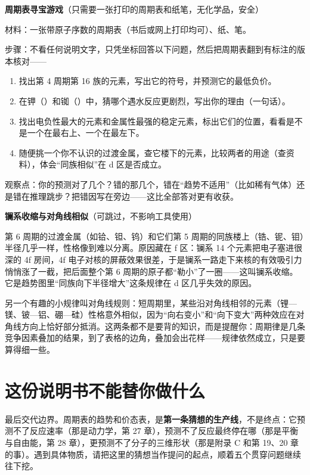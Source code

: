 \begin{shiyan}
\textbf{周期表寻宝游戏}（只需要一张打印的周期表和纸笔，无化学品，安全）

材料：一张带原子序数的周期表（书后或网上打印均可）、纸、笔。

步骤：不看任何说明文字，只凭坐标回答以下问题，然后把周期表翻到有标注的版本核对——
\begin{enumerate}[itemsep=1pt]
\item 找出第 4 周期第 16 族的元素，写出它的符号，并预测它的最低负价。
\item 在钾（）和铷（）中，猜哪个遇水反应更剧烈，写出你的理由（一句话）。
\item 找出电负性最大的元素和金属性最强的稳定元素，标出它们的位置，看看是不是一个在最右上、一个在最左下。
\item 随便挑一个你不认识的过渡金属，查它楼下的元素，比较两者的用途（查资料），体会“同族相似”在 d 区是否成立。
\end{enumerate}

观察点：你的预测对了几个？错的那几个，错在“趋势不适用”（比如稀有气体）还是错在推理跳步？把错因写在旁边——这比全部答对更有收获。
\end{shiyan}

\begin{tiaozhan}
\textbf{镧系收缩与对角线相似}（可跳过，不影响工具使用）

第 6 周期的过渡金属（如铪、钽、钨）和它们第 5 周期的同族楼上（锆、铌、钼）半径几乎一样，性格像到难以分离。原因藏在 f 区：镧系 14 个元素把电子塞进很深的 4f 房间，4f 电子对核的屏蔽效果很差，于是镧系一路走下来核的有效吸引力悄悄涨了一截，把后面整个第 6 周期的原子都“勒小”了一圈——这叫镧系收缩。它是趋势图里“同族向下半径增大”这条规律在 d 区几乎失效的原因。

另一个有趣的小规律叫对角线规则：短周期里，某些沿对角线相邻的元素（锂—镁、铍—铝、硼—硅）性格意外相似，因为“向右变小”和“向下变大”两种效应在对角线方向上恰好部分抵消。这两条都不是要背的知识，而是提醒你：周期律是几条竞争因素叠加的结果，到了表格的边角，叠加会出花样——规律依然成立，只是要算得细一些。
\end{tiaozhan}

\section{这份说明书不能替你做什么}

最后交代边界。周期表的趋势和价态表，是\textbf{第一条猜想的生产线}，不是终点：它预测不了反应速率（那是动力学，第 27 章），预测不了反应最终停在哪（那是平衡与自由能，第 28 章），更预测不了分子的三维形状（那是附录 C 和第 19、20 章的事）。遇到具体物质，请把这里的猜想当作提问的起点，顺着五个贯穿问题继续往下挖。

